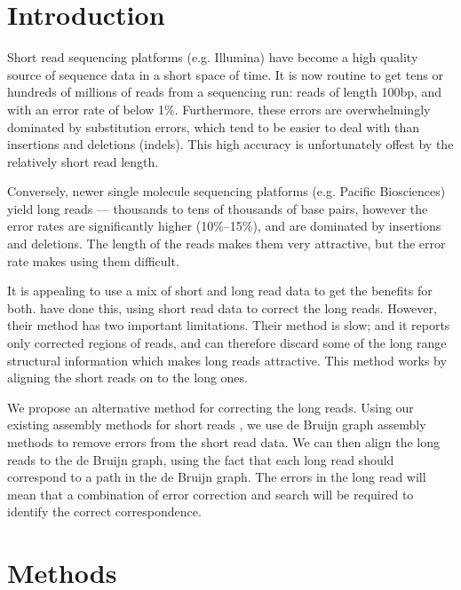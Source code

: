 \documentclass[twocolumn]{article}
\begin{document}
\section{Introduction}

Short read sequencing platforms (e.g. Illumina) have become a high quality source of sequence
data in a short space of time.  It is now routine to get tens or
hundreds of millions of reads from a sequencing run: reads of length
100bp, and with an error rate of below 1\%. Furthermore, these
errors are overwhelmingly dominated by substitution errors, which
tend to be easier to deal with than insertions and deletions (indels).
This high accuracy is unfortunately offest by the relatively short
read length.

Conversely, newer single molecule sequencing platforms (e.g. Pacific Biosciences)
yield long reads --- thousands to tens of thousands of base pairs, however the
error rates are significantly higher (10\%--15\%),
and are dominated by insertions and deletions.
The length of the reads makes them very attractive, but the error rate makes using them difficult.

It is appealing to use a mix of short and long read data to get the benefits for both.
\cite{xxx} have done this, using short read data to correct the long reads. However,
their method has two important limitations. Their method is slow; and it reports only corrected
regions of reads, and can therefore discard some of the long range structural information which
makes long reads attractive.
This method works by aligning the short reads on to the long ones.

We propose an alternative method for correcting the long reads. Using our existing assembly methods
for short reads \cite{goss2012}, we use de Bruijn graph assembly methods to remove errors from the
short read data. We can then align the long reads to the de Bruijn graph, using the fact that each
long read should correspond to a path in the de Bruijn graph. The errors in the long read will mean
that a combination of error correction and search will be required to identify the correct
correspondence.

\section{Methods}
\end{document}
